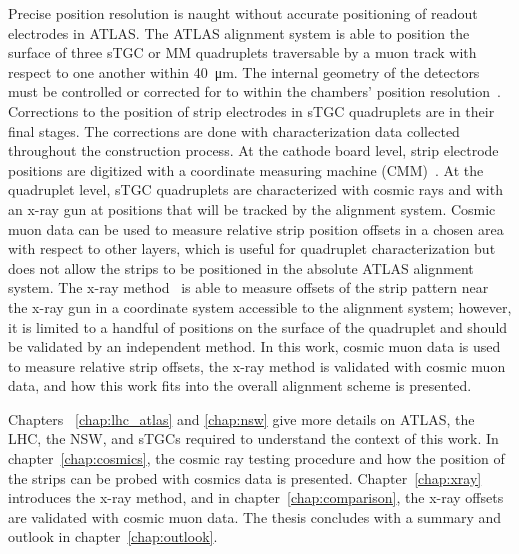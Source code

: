 Precise position resolution is naught without accurate positioning of readout electrodes in ATLAS. The ATLAS alignment system is able to position the surface of three sTGC or MM quadruplets traversable by a muon track with respect to one another within \SI{40}{\micro\meter}. The internal geometry of the detectors must be controlled or corrected for to within the chambers' position resolution~\cite{nsw_tdr}. Corrections to the position of strip electrodes in sTGC quadruplets are in their final stages. The corrections are done with characterization data collected throughout the construction process. At the cathode board level, strip electrode positions are digitized with a coordinate measuring machine (CMM)~\cite{carlson_results_2019}. At the quadruplet level, sTGC quadruplets are characterized with cosmic rays and with an x-ray gun at positions that will be tracked by the alignment system. Cosmic muon data can be used to measure relative strip position offsets in a chosen area with respect to other layers, which is useful for quadruplet characterization but does not allow the strips to be positioned in the absolute ATLAS alignment system. The x-ray method~\cite{lefebvre_precision_2020} is able to measure offsets of the strip pattern near the x-ray gun in a coordinate system accessible to the alignment system; however, it is limited to a handful of positions on the surface of the quadruplet and should be validated by an independent method. In this work, cosmic muon data is used to measure relative strip offsets, the x-ray method is validated with cosmic muon data, and how this work fits into the overall alignment scheme is presented.

Chapters ~\ref{chap:lhc_atlas} and \ref{chap:nsw} give more details on ATLAS, the LHC, the NSW, and sTGCs required to understand the context of this work. In chapter~\ref{chap:cosmics}, the cosmic ray testing procedure and how the position of the strips can be probed with cosmics data is presented. Chapter~\ref{chap:xray} introduces the x-ray method, and in chapter~\ref{chap:comparison}, the x-ray offsets are validated with cosmic muon data. The thesis concludes with a summary and outlook in chapter~\ref{chap:outlook}.

